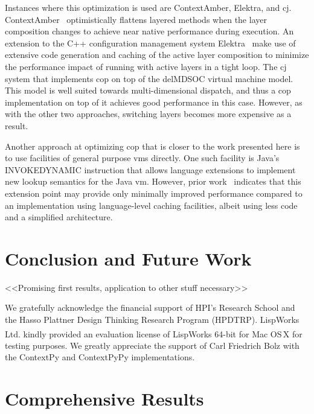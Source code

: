 \documentclass[preprint,english,10pt,nonatbib]{sigplanconf}
\begin{document}
Instances where this optimization is used are ContextAmber, Elektra, and
cj. ContextAmber~\cite{springer2015efficient} optimistically flattens layered
methods when the layer composition changes to achieve near native performance
during execution. An extension to the C++ configuration management system
Elektra~\cite{Raab:2014:PEE:2637066.2637074} make use of extensive code
generation and caching of the active layer composition to minimize the
performance impact of running with active layers in a tight loop. The
cj\cite{schippers2009implementation,schippers2008delegation} system that
implements \ac{cop} on top of the delMDSOC virtual machine model. This model is
well suited towards multi-dimensional dispatch, and thus a \ac{cop}
implementation on top of it achieves good performance in this case. However, as
with the other two approaches, switching layers becomes more expensive as a
result.

Another approach at optimizing \ac{cop} that is closer to the work presented
here is to use facilities of general purpose \acp{vm} directly. One such
facility is Java's INVOKEDYNAMIC instruction that allows language extensions to
implement new lookup semantics for the Java \ac{vm}. However, prior
work~\cite{appeltauer2010layered} indicates that this extension point may
provide only minimally improved performance compared to an implementation using
language-level caching facilities, albeit using less code and a simplified
architecture.

\section{Conclusion and Future Work}


<<Promising first results, application to other stuff necessary>>

\acks
We gratefully acknowledge the financial support of HPI's Research School and
the Hasso Plattner Design Thinking Research Program (HPDTRP).
LispWorks Ltd. kindly provided an evaluation license of
LispWorks\textsuperscript{\textregistered} 64-bit for Mac OS\,X for testing
purposes. We greatly appreciate the support of Carl Friedrich Bolz with the
ContextPy and ContextPyPy implementations.
\printbibliography
\appendix
{}
\section{Comprehensive Results}


\end{document}
